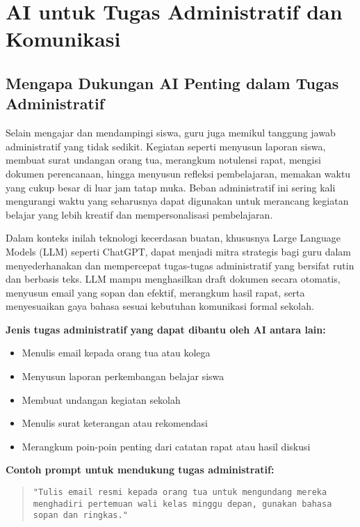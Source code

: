 \chapter{AI untuk Tugas Administratif dan Komunikasi}

\section{Mengapa Dukungan AI Penting dalam Tugas Administratif}

Selain mengajar dan mendampingi siswa, guru juga memikul tanggung jawab administratif yang tidak sedikit. Kegiatan seperti menyusun laporan siswa, membuat surat undangan orang tua, merangkum notulensi rapat, mengisi dokumen perencanaan, hingga menyusun refleksi pembelajaran, memakan waktu yang cukup besar di luar jam tatap muka. Beban administratif ini sering kali mengurangi waktu yang seharusnya dapat digunakan untuk merancang kegiatan belajar yang lebih kreatif dan mempersonalisasi pembelajaran.

Dalam konteks inilah teknologi kecerdasan buatan, khususnya Large Language Models (LLM) seperti ChatGPT, dapat menjadi mitra strategis bagi guru dalam menyederhanakan dan mempercepat tugas-tugas administratif yang bersifat rutin dan berbasis teks. LLM mampu menghasilkan draft dokumen secara otomatis, menyusun email yang sopan dan efektif, merangkum hasil rapat, serta menyesuaikan gaya bahasa sesuai kebutuhan komunikasi formal sekolah.

\textbf{Jenis tugas administratif yang dapat dibantu oleh AI antara lain:}
\begin{itemize}
	\item Menulis email kepada orang tua atau kolega
	\item Menyusun laporan perkembangan belajar siswa
	\item Membuat undangan kegiatan sekolah
	\item Menulis surat keterangan atau rekomendasi
	\item Merangkum poin-poin penting dari catatan rapat atau hasil diskusi
\end{itemize}

\textbf{Contoh prompt untuk mendukung tugas administratif:}

\begin{quote}
	\centering
	\texttt{"Tulis email resmi kepada orang tua untuk mengundang mereka menghadiri pertemuan wali kelas minggu depan, gunakan bahasa sopan dan ringkas."}
\end{quote}

